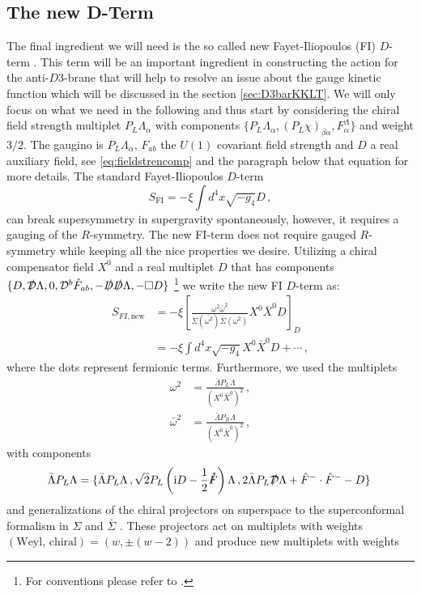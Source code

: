 \documentclass[12pt]{report}
\newcommand{\be}{\begin{equation}}
\newcommand{\ee}{\end{equation}}
\newcommand{\bea}{\begin{equation}\begin{aligned}}
\newcommand{\eea}{\end{aligned}\end{equation}}
\def\rmi{{\rm i}}
\begin{document}
\subsection{The new D-Term}
\label{sec:newD}
The final ingredient we will need is the so called new Fayet-Iliopoulos (FI) $D$-term \cite{Cribiori:2017laj,Cribiori:2018dlc,Cribiori:2018hxv}. This term will be an important ingredient in constructing the action for the anti-$D3$-brane that will help to resolve an issue about the gauge kinetic function which will be discussed in the section \ref{sec:D3barKKLT}. We will only focus on what we need in the following and thus start by considering the chiral field strength multiplet $P_L \Lambda_\alpha$ with components $\{P_L\Lambda_\alpha,(P_L\chi)_{\beta\alpha},F_\alpha^\Lambda\}$ and weight $3/2$. The gaugino is $P_L \Lambda_\alpha$, $F_{ab}$ the $U(1)$ covariant field strength and $D$ a real auxiliary field, see \eqref{eq:fieldstrencomp} and the paragraph below that equation for more details. The standard Fayet-Iliopoulos $D$-term \cite{Fayet:1974jb,Freedman:1976uk} 
\be 
S_{\text{FI}}=-\xi \int d^4x \sqrt{-g_4}D\,,
\label{eq:FIDterm}
\ee
can break supersymmetry in supergravity spontaneously, however, it requires a gauging of the $R$-symmetry. The new FI-term does not require gauged $R$-symmetry while keeping all the nice properties we desire. Utilizing a chiral compensator field $X^0$ and a real multiplet $D$ that has components $\{D,\slashed{\mathcal{D}}\Lambda,0,\mathcal{D}^b \hat{F}_{ab},-\slashed{D}\slashed{D}\Lambda,-\square D\}$ \footnote{For conventions please refer to \cite{Freedman:2012zz}.} we write the new FI $D$-term as:
\bea 
S_{FI,\text{new}} &= - \xi \left[ \frac{\omega^2\bar{\omega}^2}{\Sigma(\bar{\omega^2})\bar{\Sigma}(\omega^2)}X^0\bar{X}^0D\right]_D\\
&= -\xi \int d^4x \sqrt{-g_4}X^0\bar{X}^0 D + \cdots\,,
\eea
where the dots represent fermionic terms. Furthermore, we used the multiplets
\bea 
\omega^2 &= \frac{\bar{\Lambda}P_L \Lambda}{\left(X^0\bar{X}^0\right)^2}\,,\\
\bar{\omega}^2 &= \frac{\bar{\Lambda}P_R\Lambda}{\left(X^0\bar{X}^0\right)^2}\,,
\label{eq:Dnew}
\eea
with components
\be 
\bar{\Lambda}P_L\Lambda = \{\bar{\Lambda}P_L\Lambda\,,\sqrt{2}P_L\left(\rmi D-\frac{1}{2}\slashed{\hat{F}}\right)\Lambda\,,2\bar{\Lambda}P_L\slashed{\mathcal{D}}\Lambda+\hat{F}^-\cdot\hat{F}^--D\}\,
\ee
and generalizations of the chiral projectors on superspace to the superconformal formalism in $\Sigma$ and $\bar{\Sigma}$ \cite{Ferrara:2016een}. These projectors act on multiplets with weights $(\text{Weyl, chiral})=(w,\pm(w-2))$ and produce new multiplets with weights
\end{document}
